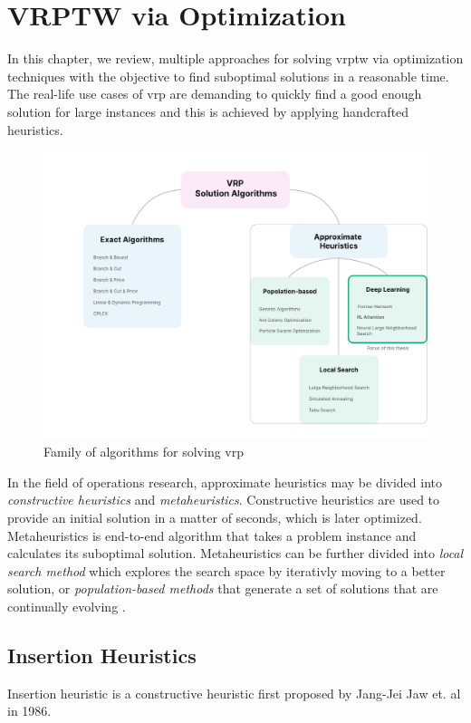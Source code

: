 \chapter{VRPTW via Optimization}
In this chapter, we review, multiple approaches for solving \gls{vrptw} via optimization techniques with the objective to find suboptimal solutions in a reasonable time. The real-life use cases of \gls{vrp} are demanding to quickly find a good enough solution for large instances and this is achieved by applying handcrafted heuristics.

\begin{figure}[ht]
    \centering
    \includegraphics[width=1.0\textwidth]{resources/vrptw-optimization/vrp-solutions.pdf}
    \caption{Family of algorithms for solving \gls{vrp}}
    \label{fig:vrp-graph}
\end{figure}

In the field of operations research, approximate heuristics may be divided into \emph{constructive heuristics} and \emph{metaheuristics}. Constructive heuristics are used to provide an initial solution in a matter of seconds, which is later optimized. Metaheuristics is end-to-end algorithm that takes a problem instance and calculates its suboptimal solution. Metaheuristics can be further divided into \emph{local search method} which explores the search space by iterativly moving to a better solution, or \emph{population-based methods} that generate a set of solutions that are continually evolving \cite{vrp-bible}.

\section{Insertion Heuristics}
Insertion heuristic is a constructive heuristic first proposed by Jang-Jei Jaw et. al \cite{i1-heuristics} in 1986.
        
